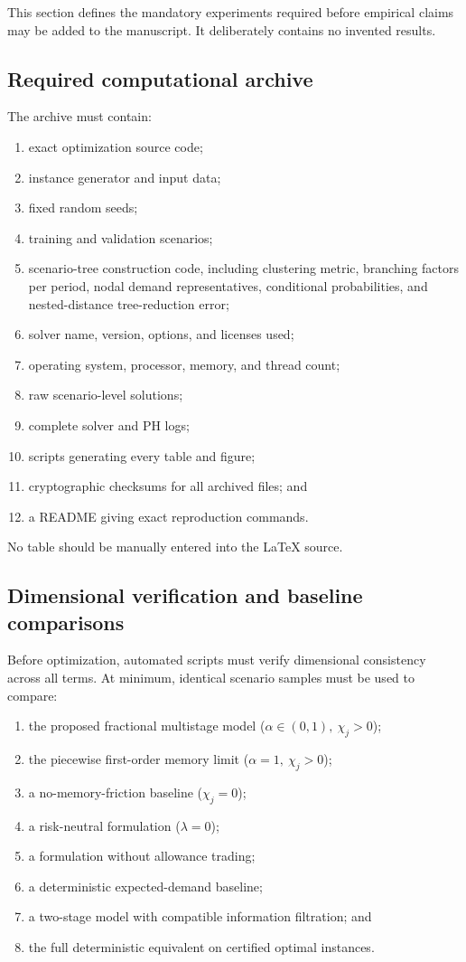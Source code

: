 \documentclass[11pt,a4paper]{article}
\begin{document}
This section defines the mandatory experiments required before empirical
claims may be added to the manuscript. It deliberately contains no
invented results.

\subsection{Required computational archive}

The archive must contain:
\begin{enumerate}
  \item exact optimization source code;
  \item instance generator and input data;
  \item fixed random seeds;
  \item training and validation scenarios;
  \item scenario-tree construction code, including clustering metric,
  branching factors per period, nodal demand representatives, conditional
  probabilities, and nested-distance tree-reduction error;
  \item solver name, version, options, and licenses used;
  \item operating system, processor, memory, and thread count;
  \item raw scenario-level solutions;
  \item complete solver and PH logs;
  \item scripts generating every table and figure;
  \item cryptographic checksums for all archived files; and
  \item a README giving exact reproduction commands.
\end{enumerate}
No table should be manually entered into the \LaTeX{} source.

\subsection{Dimensional verification and baseline comparisons}

Before optimization, automated scripts must verify dimensional
consistency across all terms. At minimum, identical scenario samples
must be used to compare:
\begin{enumerate}
  \item the proposed fractional multistage model
  (\(\alpha\in(0,1),\ \chi_j>0\));
  \item the piecewise first-order memory limit
  (\(\alpha=1,\ \chi_j>0\));
  \item a no-memory-friction baseline (\(\chi_j=0\));
  \item a risk-neutral formulation (\(\lambda=0\));
  \item a formulation without allowance trading;
  \item a deterministic expected-demand baseline;
  \item a two-stage model with compatible information filtration; and
  \item the full deterministic equivalent on certified optimal
  instances.
\end{enumerate}
\end{document}
